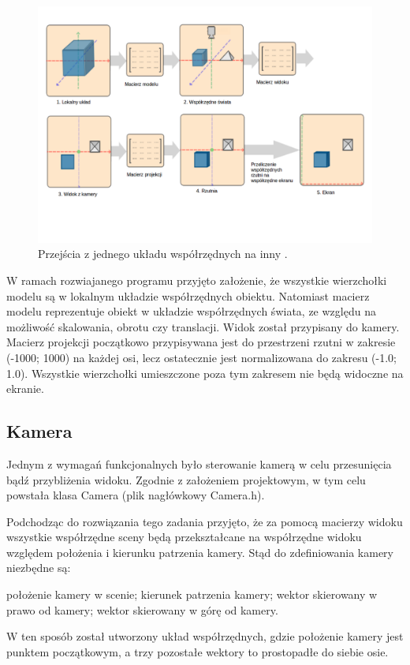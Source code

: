 \begin{figure}[H]
		\centering
 		\includegraphics[width=12.0cm]{coordinate_systems.png}
    	\caption{Przejścia z jednego układu współrzędnych na inny \cite{opengltutorial}.}
 		\label{rys11}
\end{figure}

W ramach rozwiajanego programu przyjęto założenie, że wszystkie wierzchołki modelu są w lokalnym układzie współrzędnych obiektu. Natomiast macierz modelu reprezentuje  obiekt w układzie współrzędnych świata, ze względu na możliwość skalowania, obrotu czy translacji. Widok został przypisany do kamery. Macierz projekcji początkowo przypisywana jest do przestrzeni rzutni w zakresie (-1000; 1000) na każdej osi, lecz ostatecznie jest normalizowana do zakresu (-1.0; 1.0). Wszystkie wierzchołki umieszczone poza tym zakresem nie będą widoczne na ekranie.

\subsection{Kamera}
Jednym z wymagań funkcjonalnych było sterowanie kamerą w celu przesunięcia bądź przybliżenia widoku. Zgodnie z założeniem projektowym, w tym celu powstała klasa Camera (plik nagłówkowy Camera.h).

Podchodząc do rozwiązania tego zadania przyjęto, że za pomocą macierzy widoku wszystkie współrzędne sceny będą przekształcane na współrzędne widoku względem położenia i kierunku patrzenia kamery. Stąd do zdefiniowania kamery niezbędne są: 
\begin{itemize}
\itemi położenie kamery w scenie;
\itemi kierunek patrzenia kamery;
\itemi wektor skierowany w prawo od kamery;
\itemi wektor skierowany w górę od kamery.
\end{itemize}
W ten sposób został utworzony układ współrzędnych, gdzie położenie kamery jest punktem początkowym, a trzy pozostałe wektory to prostopadłe do siebie osie. 

